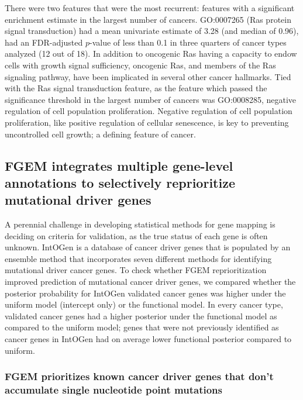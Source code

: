 There were two features that were the most recurrent: features with a significant enrichment estimate in the largest number of cancers.  GO:0007265 (Ras protein signal transduction) had a mean univariate estimate of 3.28 (and median of
0.96), had an FDR-adjusted $p$-value of less than 0.1 in three quarters of cancer types analyzed (12 out of 18). In addition to oncogenic Ras having a capacity to endow cells with growth signal sufficiency, oncogenic Ras, and members
of the Ras signaling pathway, have been implicated in several other cancer hallmarks\cite{Pylayeva_Gupta_2011}.  Tied with the Ras signal transduction feature, as the feature which passed the significance threshold in the largest
number of cancers was GO:0008285, negative regulation of cell population proliferation.  Negative regulation of cell population proliferation, like positive regulation of cellular senescence, is key to preventing uncontrolled cell growth; a defining feature of cancer\cite{Hanahan_2011}.

\subsection{FGEM integrates multiple gene-level annotations to selectively reprioritize mutational driver genes}\label{sec:orgf0225be}

A perennial challenge in developing statistical methods for gene mapping is deciding on criteria for validation, as the true status of each gene is often unknown\cite{Schaid_2018}\cite{drivermaps}.  IntOGen is a database of cancer driver genes that is populated by an ensemble method that incorporates seven different methods for identifying mutational driver cancer genes. To check whether FGEM reprioritization improved prediction of mutational cancer driver genes, we compared whether the posterior probability for IntOGen validated cancer genes was higher under the uniform model (intercept only) or the functional model. In every cancer type, validated cancer genes had a higher posterior under the functional model as compared to the uniform model;  genes that were not previously identified as cancer genes in IntOGen had on average lower functional posterior compared to uniform.


\subsubsection{FGEM prioritizes known cancer driver genes that don't accumulate single nucleotide point mutations}

